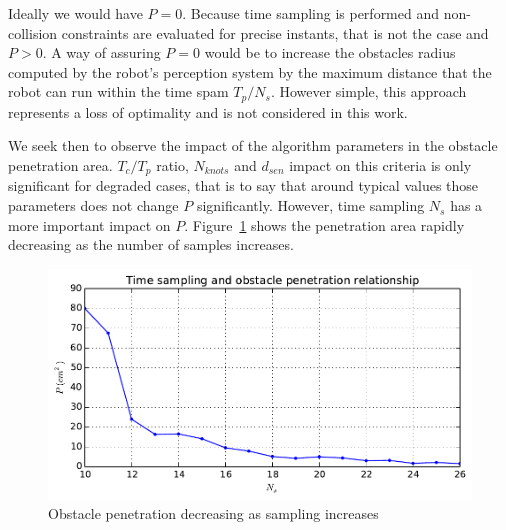 \documentclass[eprint]{actapoly}
\begin{document}
Ideally we would have $P = 0$. Because time sampling is performed and non-collision 
constraints are evaluated for precise instants, that is not the case and $P>0$.
A way of assuring $P = 0$ would  be to increase the obstacles radius computed by the robot's 
perception system by the 
maximum distance that the robot can run within the time spam $T_p/N_s$. However simple,
this approach represents a loss of optimality and is not considered in this work.

We seek then to observe the impact of the algorithm parameters in the obstacle penetration
area. $T_c/T_p$ ratio, $N_{knots}$ and $d_{sen}$ impact on this criteria is only 
significant for degraded cases, that is to say that around typical values those parameters 
does not change $P$ significantly. However, time sampling $N_s$ has a more important impact
on $P$. 
Figure~\ref{fig:res} shows the penetration area rapidly decreasing as the number of samples 
increases.
\begin{figure}[!h]\centering
  \includegraphics[width=\linewidth]{./images/penetration/pen-nsi.pdf} %
  \caption{Obstacle penetration decreasing as sampling increases}
\label{fig:res}
\end{figure}
\end{document}

